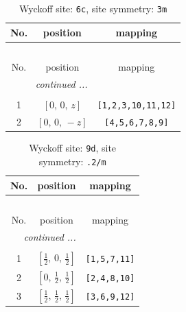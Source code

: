 \documentclass[fleqn,8pt]{jsarticle}
\begin{document}
\begin{longtable}{ccc}
\caption{Wyckoff site: {\tt 6c}, site symmetry: {\tt 3m}}
 \\
 \hline \hline
No. & position & mapping \\ \hline \endfirsthead

\multicolumn{2}{l}{\tablename\ \thetable{}} \\
 \hline \hline
No. & position & mapping \\ \hline \endhead

 \hline \hline
\multicolumn{2}{r}{\footnotesize\it continued ...} \\ \endfoot

 \hline \hline
\multicolumn{2}{r}{} \\ \endlastfoot

1 & $\left[ 0,\, 0,\, z \right]$ & {\tt [1,2,3,10,11,12]} \\ \hline
2 & $\left[ 0,\, 0,\, - z \right]$ & {\tt [4,5,6,7,8,9]} \\
\end{longtable}
\renewcommand{\arraystretch}{1.2}
\begin{longtable}{ccc}
\caption{Wyckoff site: {\tt 9d}, site symmetry: {\tt .2/m}}
 \\
 \hline \hline
No. & position & mapping \\ \hline \endfirsthead

\multicolumn{2}{l}{\tablename\ \thetable{}} \\
 \hline \hline
No. & position & mapping \\ \hline \endhead

 \hline \hline
\multicolumn{2}{r}{\footnotesize\it continued ...} \\ \endfoot

 \hline \hline
\multicolumn{2}{r}{} \\ \endlastfoot

1 & $\left[ \frac{1}{2},\, 0,\, \frac{1}{2} \right]$ & {\tt [1,5,7,11]} \\ \hline
2 & $\left[ 0,\, \frac{1}{2},\, \frac{1}{2} \right]$ & {\tt [2,4,8,10]} \\ \hline
3 & $\left[ \frac{1}{2},\, \frac{1}{2},\, \frac{1}{2} \right]$ & {\tt [3,6,9,12]} \\
\end{longtable}
\renewcommand{\arraystretch}{1.2}
\end{document}
